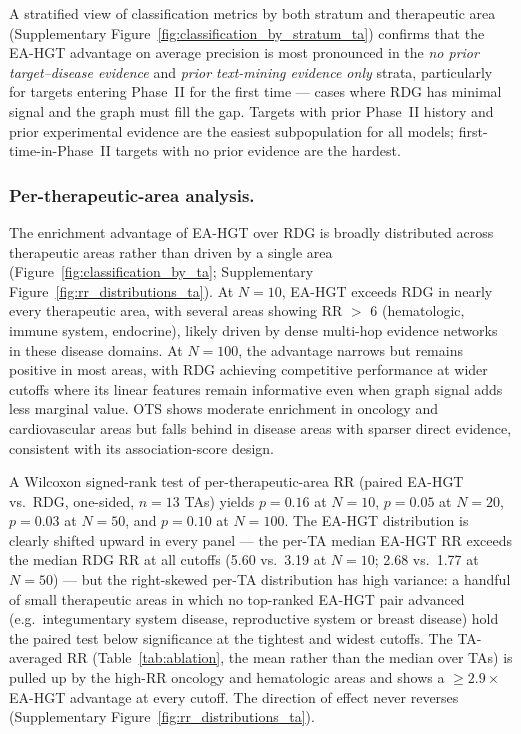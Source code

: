 \documentclass[a4,center]{NAR}
\newcommand{\eahgt}{\textsc{EA-HGT}}
\begin{document}
{A stratified view of classification metrics by both stratum and
therapeutic area (Supplementary Figure~\ref{fig:classification_by_stratum_ta})
confirms that the \eahgt{} advantage on average precision is most
pronounced in the \emph{no prior target--disease evidence} and
\emph{prior text-mining evidence only} strata, particularly for targets
entering Phase~II for the first time --- cases where RDG has minimal
signal and the graph must fill the gap. Targets with prior Phase~II
history and prior experimental evidence are the easiest subpopulation
for all models; first-time-in-Phase~II targets with no prior evidence
are the hardest.

\subsubsection{Per-therapeutic-area analysis.}

The enrichment advantage of \eahgt{} over RDG is broadly distributed
across therapeutic areas rather than driven by a single area
(Figure~\ref{fig:classification_by_ta}; Supplementary
Figure~\ref{fig:rr_distributions_ta}). At
$N = 10$, \eahgt{} exceeds RDG in nearly every therapeutic area, with
several areas showing RR $>$ 6 (hematologic, immune system, endocrine),
likely driven by dense multi-hop evidence networks in these disease
domains. At $N = 100$, the advantage narrows but remains positive in most
areas, with RDG achieving competitive performance at wider cutoffs where
its linear features remain informative even when graph signal adds less
marginal value. OTS shows moderate enrichment in oncology and
cardiovascular areas but falls behind in disease areas with sparser direct
evidence, consistent with its association-score design.

A Wilcoxon signed-rank test of per-therapeutic-area RR (paired \eahgt{}
vs.\ RDG, one-sided, $n = 13$ TAs) yields $p = 0.16$ at $N = 10$,
$p = 0.05$ at $N = 20$, $p = 0.03$ at $N = 50$, and $p = 0.10$ at
$N = 100$. The \eahgt{} distribution is clearly shifted upward in
every panel --- the per-TA median \eahgt{} RR exceeds the median RDG
RR at all cutoffs (5.60 vs.\ 3.19 at $N = 10$; 2.68 vs.\ 1.77 at
$N = 50$) --- but the right-skewed per-TA distribution has high
variance: a handful of small therapeutic areas in which no
top-ranked \eahgt{} pair advanced (e.g.\ integumentary system
disease, reproductive system or breast disease) hold the paired test
below significance at the tightest and widest cutoffs. The
TA-averaged RR (Table~\ref{tab:ablation}, the mean rather than the
median over TAs) is pulled up by the high-RR oncology and
hematologic areas and shows a $\geq 2.9\times$ \eahgt{} advantage at
every cutoff. The direction of effect never reverses
(Supplementary Figure~\ref{fig:rr_distributions_ta}).


}
\end{document}
